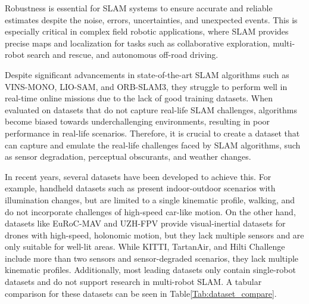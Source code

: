 \documentclass[10pt,twocolumn,letterpaper]{article}
\begin{document}
Robustness is essential for SLAM systems to ensure accurate and reliable estimates despite the noise, errors, uncertainties, and unexpected events. This is especially critical in complex field robotic applications, where SLAM provides precise maps and localization for tasks such as collaborative exploration, multi-robot search and rescue, and autonomous off-road driving.

Despite significant advancements in state-of-the-art SLAM algorithms such as VINS-MONO, LIO-SAM, and ORB-SLAM3\cite{vins-mono, liosam2020shan, orb-slam3}, they struggle to perform well in real-time online missions due to the lack of good training datasets. When evaluated on datasets that do not capture real-life SLAM challenges, algorithms become biased towards underchallenging environments, resulting in poor performance in real-life scenarios. Therefore, it is crucial to create a dataset that can capture and emulate the real-life challenges faced by SLAM algorithms, such as sensor degradation, perceptual obscurants, and weather changes.

In recent years, several datasets have been developed to achieve this. For example, handheld datasets such as \cite{helmberger2022hilti, ramezani2020newer, pfrommer2017penncosyvio, schubert2018tum, zuniga2020vi} present indoor-outdoor scenarios with illumination changes, but are limited to a single kinematic profile, walking, and do not incorporate challenges of high-speed car-like motion. On the other hand, datasets like EuRoC-MAV\cite{Burri25012016} and UZH-FPV\cite{Delmerico19icra} provide visual-inertial datasets for drones with high-speed, holonomic motion, but they lack multiple sensors and are only suitable for well-lit areas. While KITTI, TartanAir, and Hilti Challenge\cite{Geiger2012CVPR, tartanair2020iros, helmberger2022hilti} include more than two sensors and sensor-degraded scenarios, they lack multiple kinematic profiles. Additionally, most leading datasets only contain single-robot datasets and do not support research in multi-robot SLAM. A tabular comparison for these datasets can be seen in Table\ref{Tab:dataset_compare}.
\end{document}
